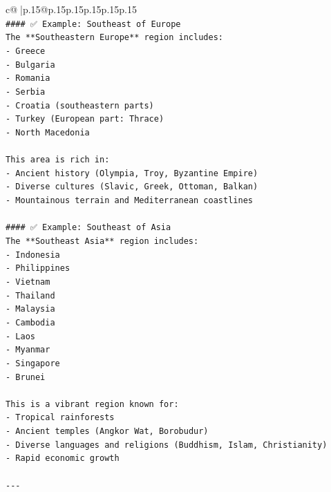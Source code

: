 \documentclass{article}
\begin{document}
{\begin{supertabular}{c@{$\;$}|p{.15\linewidth}@{}p{.15\linewidth}p{.15\linewidth}p{.15\linewidth}p{.15\linewidth}p{.15\linewidth}}
{{{\\ 
\texttt{\#\#\#\# ✅ Example: Southeast of Europe} \\
\texttt{The **Southeastern Europe** region includes:} \\
\texttt{{-} Greece} \\
\texttt{{-} Bulgaria} \\
\texttt{{-} Romania} \\
\texttt{{-} Serbia} \\
\texttt{{-} Croatia (southeastern parts)} \\
\texttt{{-} Turkey (European part: Thrace)} \\
\texttt{{-} North Macedonia} \\
\\ 
\texttt{This area is rich in:} \\
\texttt{{-} Ancient history (Olympia, Troy, Byzantine Empire)} \\
\texttt{{-} Diverse cultures (Slavic, Greek, Ottoman, Balkan)} \\
\texttt{{-} Mountainous terrain and Mediterranean coastlines} \\
\\ 
\texttt{\#\#\#\# ✅ Example: Southeast of Asia} \\
\texttt{The **Southeast Asia** region includes:} \\
\texttt{{-} Indonesia} \\
\texttt{{-} Philippines} \\
\texttt{{-} Vietnam} \\
\texttt{{-} Thailand} \\
\texttt{{-} Malaysia} \\
\texttt{{-} Cambodia} \\
\texttt{{-} Laos} \\
\texttt{{-} Myanmar} \\
\texttt{{-} Singapore} \\
\texttt{{-} Brunei} \\
\\ 
\texttt{This is a vibrant region known for:} \\
\texttt{{-} Tropical rainforests} \\
\texttt{{-} Ancient temples (Angkor Wat, Borobudur)} \\
\texttt{{-} Diverse languages and religions (Buddhism, Islam, Christianity)} \\
\texttt{{-} Rapid economic growth} \\
\\ 
\texttt{{-}{-}{-}} \\
}}}
\end{supertabular}}
\end{document}
